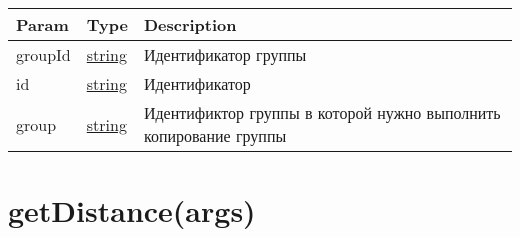 \begin{longtable}[]{@{}lll@{}}
\toprule
\begin{minipage}[b]{0.30\columnwidth}\raggedright
Param\strut
\end{minipage} & \begin{minipage}[b]{0.30\columnwidth}\raggedright
Type\strut
\end{minipage} & \begin{minipage}[b]{0.30\columnwidth}\raggedright
Description\strut
\end{minipage}\tabularnewline
\midrule
\endhead
\begin{minipage}[t]{0.30\columnwidth}\raggedright
groupId\strut
\end{minipage} & \begin{minipage}[t]{0.30\columnwidth}\raggedright
\protect\hyperlink{string}{string}\strut
\end{minipage} & \begin{minipage}[t]{0.30\columnwidth}\raggedright
Идентификатор группы\strut
\end{minipage}\tabularnewline
\begin{minipage}[t]{0.30\columnwidth}\raggedright
id\strut
\end{minipage} & \begin{minipage}[t]{0.30\columnwidth}\raggedright
\protect\hyperlink{string}{string}\strut
\end{minipage} & \begin{minipage}[t]{0.30\columnwidth}\raggedright
Идентификатор\strut
\end{minipage}\tabularnewline
\begin{minipage}[t]{0.30\columnwidth}\raggedright
group\strut
\end{minipage} & \begin{minipage}[t]{0.30\columnwidth}\raggedright
\protect\hyperlink{string}{string}\strut
\end{minipage} & \begin{minipage}[t]{0.30\columnwidth}\raggedright
Идентификтор группы в которой нужно выполнить копирование группы\strut
\end{minipage}\tabularnewline
\bottomrule
\end{longtable}

\hypertarget{getdistanceargs-dlmap}{%
\section{getDistance(args)}\label{getdistanceargs-dlmap}}

